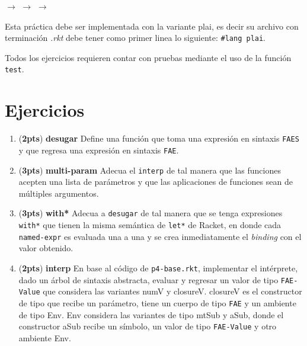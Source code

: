 \documentclass{article}
\newcommand{\grade}[1]{(\textbf{#1pts}) }
\begin{document}
\begin{center}
 $\rightarrow$
 $\rightarrow$
 $\rightarrow$
\end{center}

Esta práctica debe ser implementada con la variante plai, es decir
su archivo con terminación \textit{.rkt} debe tener como primer linea lo siguiente:
\texttt{\#lang plai}.

Todos los ejercicios requieren contar con pruebas mediante el uso de
la función \texttt{test}.

\section{Ejercicios}

\begin{enumerate}

\item \grade{2} \textbf{desugar} Define una función que toma una expresión en sintaxis \texttt{FAES} y que regresa una expresión en sintaxis \texttt{FAE}.

\item \grade{3} \textbf{multi-param} Adecua el \texttt{interp} de tal manera que las funciones acepten una lista de parámetros y que las aplicaciones de funciones sean de múltiples argumentos.

\item \grade{3} \textbf{with*} Adecua a \texttt{desugar} de tal manera que se tenga expresiones \texttt{with*} que tienen la misma semántica de \texttt{let*} de Racket, en donde cada \texttt{named-expr} es evaluada una a una y se crea inmediatamente el \textit{binding} con el valor obtenido.

\item \grade{2} \textbf{interp} En base al código de \texttt{p4-base.rkt}, implementar el intérprete, dado un árbol de sintaxis abstracta, evaluar y regresar un valor de tipo \texttt{FAE-Value} que considera las variantes numV y closureV. closureV es el constructor de tipo que recibe un parámetro, tiene un cuerpo de tipo \texttt{FAE} y un ambiente de tipo Env. Env considera las variantes de tipo mtSub y aSub, donde el constructor aSub recibe un símbolo, un valor de tipo \texttt{FAE-Value} y otro ambiente Env.

\end{enumerate}
\end{document}
